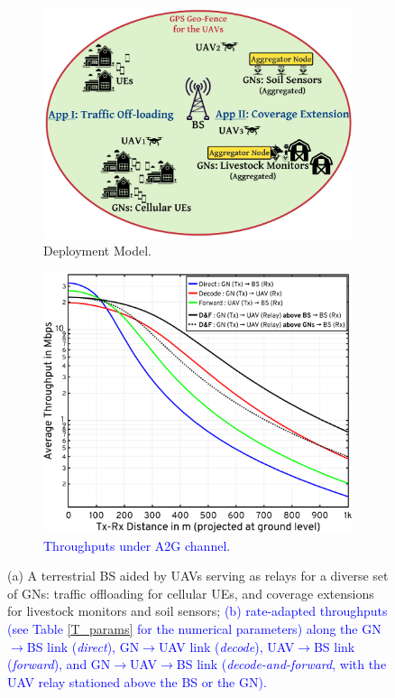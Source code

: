 \documentclass[12pt, draftcls, onecolumn]{IEEEtran}
\theoremstyle{plain}
\theoremstyle{definition}
\theoremstyle{remark}
\newcommand\hlt[1]{\textcolor{blue}{#1}}
\begin{document}
\begin{figure} [t]
    \begin{subfigure}{0.505\linewidth}
        \centering
        \includegraphics[width=1.0\linewidth]{figs/Deployment_Model.jpeg}
        \caption{Deployment Model.}
        \label{F1}
    \end{subfigure}
    \hfill
    \begin{subfigure}{0.44\linewidth}
        \centering
        \includegraphics[width=1.0\linewidth]{figs/Channel_Model.jpg}
        \caption{\hlt{Throughputs under A2G channel.}}
        \label{F2}
    \end{subfigure}
    \vspace{-2mm}
    \caption{(a) A terrestrial BS aided by UAVs serving as relays for a diverse set of GNs: traffic offloading for cellular UEs, and coverage extensions for livestock monitors and soil sensors; \hlt{(b) rate-adapted throughputs (see Table \ref{T_params} for the numerical parameters) along the GN${\rightarrow}$BS link (\emph{direct}), GN${\rightarrow}$UAV link (\emph{decode}),  UAV${\rightarrow}$BS link (\emph{forward}), and GN${\rightarrow}$UAV${\rightarrow}$BS link (\emph{decode-and-forward}, with the UAV relay stationed above the BS or the GN).}}
    \label{F1andF2}
\end{figure}
\end{document}
